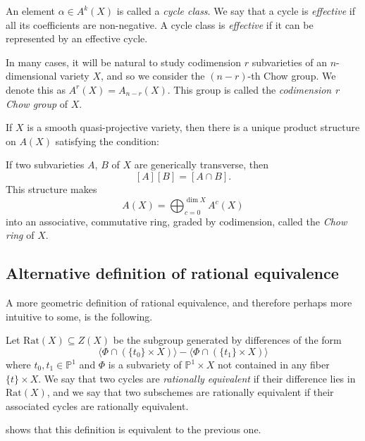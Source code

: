 An element $\alpha \in A^k(X)$ is called a \emph{cycle class}. We say that a cycle is \emph{effective} if all its coefficients are non-negative. A cycle class is \emph{effective} if it can be represented by an effective cycle.

\begin{remark}
    In many cases, it will be natural to study codimension $r$ subvarieties of an $n$-dimensional variety $X$, and so we consider the $(n-r)$-th Chow group. We denote this as $A^r(X) = A_{n-r}(X)$. This group is called the \emph{codimension r Chow group} of $X$.
\end{remark}



\begin{theorem}\label{thm:chow}
    If $X$ is a smooth quasi-projective variety, then there is a unique product structure on $A(X)$ satisfying the condition:

    If two subvarieties $A$, $B$ of $X$ are generically transverse, then
    \[[A][B] = [A \cap B].\]
    This structure makes 
    \[A(X) = \bigoplus_{c=0}^{\dim X} A^c(X)\]
    into an associative, commutative ring, graded by codimension, called the \emph{Chow ring} of $X$.
\end{theorem}





\subsection{Alternative definition of rational equivalence}
A more geometric definition of rational equivalence, and therefore perhaps more intuitive to some, is the following. 
\begin{definition}
    Let $\text{Rat}(X) \subseteq Z(X)$ be the subgroup generated by differences of the form
\[\langle \Phi \cap (\{t_0\} \times X) \rangle - \langle \Phi \cap (\{t_1\} \times X) \rangle\]
where $t_0,t_1 \in \mathbb{P}^1$ and $\Phi$ is a subvariety of $\mathbb{P}^1 \times X$ not contained in any fiber $\{t\} \times X$. We say that two cycles are \emph{rationally equivalent} if their difference lies in $\text{Rat}(X)$, and we say that two subschemes are rationally equivalent if their associated cycles are rationally equivalent.
\end{definition}
\cite[Section 1.6]{FUL84} shows that this definition is equivalent to the previous one.

